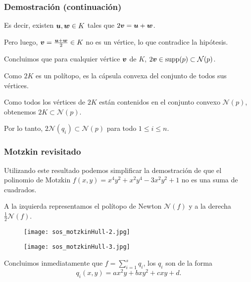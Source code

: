 \documentclass[aspectratio=169,12pt,spanish]{beamer}
\begin{document}

\begin{frame}
\frametitle{Demostración (continuación)}


Es decir, existen $\bm{u}, \bm{w} \in K$ tales que $2\bm{v} = \bm{u}+\bm{w}$.

Pero luego, $\bm{v} = \frac{\bm{u}+\bm{w}}{2} \in K$ no es un vértice, lo que contradice la hipótesis.

Concluimos que para cualquier vértice $\bm{v}$ de $K$, $2\bm{v} \in \operatorname{supp}(p) \subset \mathcal{N}(p)$. 

Como $2K$ es un polítopo, es la cápsula convexa del conjunto de todos sus vértices. 

Como todos los vértices de $2K$ están contenidos en el conjunto convexo $\mathcal{N}(p)$, obtenemos $2K \subset \mathcal{N}(p)$. 

Por lo tanto, $2 \mathcal{N}(q_i) \subset \mathcal{N}(p)$ para todo $1 \le i \le n$.


\end{frame}


\begin{frame}
\frametitle{Motzkin revisitado}

Utilizando este resultado podemos simplificar la demostración de que el polinomio de Motzkin $f(x, y) = x^4y^2 + x^2y^4 - 3x^2y^2+1$ no es una suma de cuadrados.

A la izquierda representamos el polítopo de Newton $\mathcal{N}(f)$ y a la derecha $\frac{1}{2}\mathcal{N}(f)$.

\begin{figure}
    \centering
    \begin{minipage}{0.45\textwidth}
        \centering
        \texttt{[image: sos\_motzkinHull-2.jpg]} %
    \end{minipage}\hfill
    \begin{minipage}{0.45\textwidth}
        \centering
        \texttt{[image: sos\_motzkinHull-3.jpg]} %
    \end{minipage}
\end{figure}

Concluimos inmediatamente que $f = \sum_{i=1}^s q_i$, los $q_i$ son de la forma
$$
q_i(x, y) = a x^2y + b x y^2 + c xy + d.
$$


\end{frame}
\end{document}
